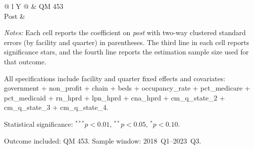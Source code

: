 \documentclass[11pt]{article}
\newcommand{\estn}[4]{\makecell[c]{$#1$ \\ $(#2)$ \\ #3 \\ {\scriptsize N=#4}}}
\begin{document}
\clearpage
\begingroup
\begin{table}[!ht]
\centering
\begin{threeparttable}
\caption{Preliminary TWFE Estimates of \textit{post} on Quality Measure 453 (2018~Q1--2023~Q3, With anticipation)}
\label{tab:qtwfe-restr18-with}
\small
\setlength{\tabcolsep}{5pt}

\begin{tabularx}{\textwidth}{@{} l Y @{}}
\toprule
 & QM 453 \\
\midrule
Post & \estn{\phantom{-}0.141}{0.166}{}{129,292} \\
\bottomrule
\end{tabularx}

\begin{tablenotes}[flushleft]
\footnotesize
\item \textit{Notes:} Each cell reports the coefficient on \textit{post} with two-way clustered standard errors (by facility and quarter) in parentheses. The third line in each cell reports significance stars, and the fourth line reports the estimation sample size used for that outcome.
\item All specifications include facility and quarter fixed effects and covariates: government + non\_profit + chain + beds + occupancy\_rate + pct\_medicare + pct\_medicaid + rn\_hprd + lpn\_hprd + cna\_hprd + cm\_q\_state\_2 + cm\_q\_state\_3 + cm\_q\_state\_4.
\item Statistical significance: $^{***}p<0.01$, $^{**}p<0.05$, $^{*}p<0.10$.
\item Outcome included: QM 453. Sample window: 2018~Q1--2023~Q3.
\end{tablenotes}
\end{threeparttable}
\end{table}
\endgroup
\end{document}
